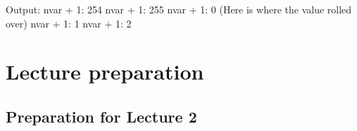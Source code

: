 \documentclass{article}
\begin{document}
\begin{enumerate}
Output:
\newline
nvar + 1: 254
\newline
nvar + 1: 255
\newline
nvar + 1: 0   (Here is where the value rolled over)
\newline
nvar + 1: 1
\newline
nvar + 1: 2

\end{enumerate}

\section{Lecture preparation}
\subsection{Preparation for Lecture 2}
\end{document}
